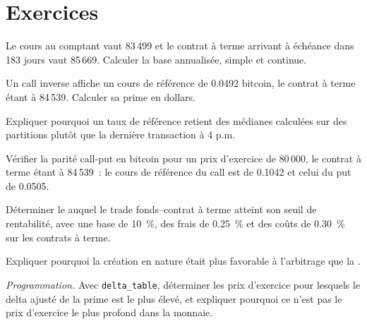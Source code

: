 \section{Exercices}

\begin{exercise}[$\star$]\label{exo:m3:dated-futures-options-and-etfs:1}
Le cours au comptant vaut 83\,499 et le contrat à terme arrivant à échéance dans 183 jours vaut 85\,669. Calculer la base annualisée, simple et continue.
\end{exercise}

\begin{exercise}[$\star$]\label{exo:m3:dated-futures-options-and-etfs:2}
Un call inverse affiche un cours de référence de 0.0492 bitcoin, le contrat à terme étant à 84\,539. Calculer sa prime en dollars.
\end{exercise}

\begin{exercise}[$\star$]\label{exo:m3:dated-futures-options-and-etfs:3}
Expliquer pourquoi un taux de référence retient des médianes calculées sur des partitions plutôt que la dernière transaction à 4 p.m.
\end{exercise}

\begin{exercise}[$\star\star$]\label{exo:m3:dated-futures-options-and-etfs:4}
Vérifier la parité call-put en bitcoin pour un prix d'exercice de 80\,000, le contrat à terme étant à 84\,539~: le cours de référence du call est de 0.1042 et celui du put de 0.0505.
\end{exercise}

\begin{exercise}[$\star\star$]\label{exo:m3:dated-futures-options-and-etfs:5}
Déterminer le  auquel le trade fonds--contrat à terme atteint son seuil de rentabilité, avec une base de 10~\%, des frais de 0.25~\% et des coûts de 0.30~\% sur les contrats à terme.
\end{exercise}

\begin{exercise}[$\star\star$]\label{exo:m3:dated-futures-options-and-etfs:6}
Expliquer pourquoi la création en nature était plus favorable à l'arbitrage que la .
\end{exercise}

\begin{exercise}[$\star\star\star$]\label{exo:m3:dated-futures-options-and-etfs:7}
\emph{Programmation.} Avec \texttt{delta\_table}, déterminer les prix d'exercice pour lesquels le delta ajusté de la prime est le plus élevé, et expliquer pourquoi ce n'est pas le
prix d'exercice le plus profond dans la monnaie.
\end{exercise}

